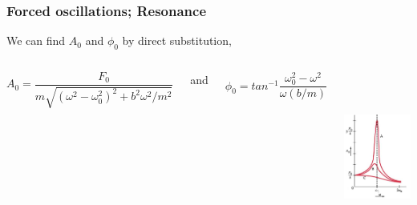 \documentclass[]{beamer}
\begin{document}
\begin{frame}
\frametitle{ Forced oscillations; Resonance}


We can find $A_0$ and $\phi_0$ by direct substitution,

\pause
   \begin{columns}[c]
   \column{2in}  %
  

 \begin{equation*}
A_0=\frac{F_0}{m\sqrt{(\omega^2-\omega^2_0)^2+b^2\omega^2/m^2}}
\end{equation*}
\pause

and


 \begin{equation*}
\phi_0=tan^{-1}\frac{\omega^2_0-\omega^2}{\omega(b/m)}
\end{equation*}

   \column{2in}

\pause

  \begin{center}
  \includegraphics[height=2.2in]{images3/resonance.jpg}
\end{center}


   \end{columns}

   
\end{frame}














 
\end{document}
